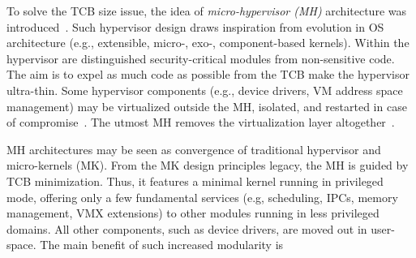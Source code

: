 \documentclass{sig-alternate}
\begin{document}
\noindent To solve the TCB size issue, the idea of \textit{micro-hypervisor (MH)} architecture was introduced~\cite{nova, NoHype, xmhf, mccune2010TruEffTCBRedAtt}. Such hypervisor design draws inspiration from evolution in OS architecture (e.g., extensible, micro-, exo-, component-based kernels). Within the hypervisor are distinguished security-critical modules from non-sensitive code. The aim is to expel as much code as possible from the TCB make the hypervisor ultra-thin. Some hypervisor components (e.g., device drivers, VM address space management) may be virtualized outside the MH, isolated, and restarted in case of compromise~\cite{nova}. The utmost MH removes the virtualization layer altogether~\cite{NoHype}.


MH architectures may be seen as convergence of traditional hypervisor and micro-kernels (MK).
From the MK design principles legacy, the MH is guided by TCB minimization. 
Thus, it features a minimal kernel running in privileged mode, offering only a few fundamental services (e.g, scheduling, IPCs, memory management, VMX extensions) to other modules running in less privileged domains. All other components, such as device drivers, are moved out in user-space. 
The main benefit of such increased modularity is
\end{document}

